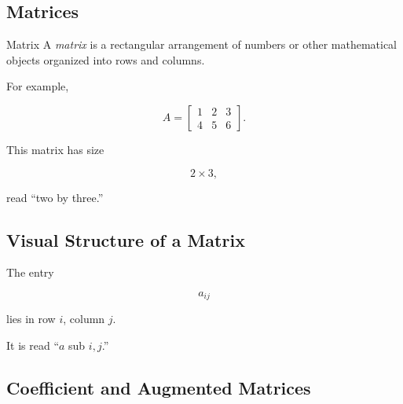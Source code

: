 \subsection{Matrices}
\label{subsec:matrices}

\begin{definitionbox}{Matrix}
A \emph{matrix} is a rectangular arrangement of numbers or other mathematical
objects organized into rows and columns.
\end{definitionbox}

For example,

\[ A=\begin{bmatrix}1&2&3\\4&5&6\end{bmatrix}. \]

This matrix has size

\[ 2\times3, \]

read ``two by three.''

\subsection{Visual Structure of a Matrix}
\label{subsec:visual-matrix-structure}

\begin{center}
\end{center}

The entry

\[ a_{ij} \]

lies in row \(i\), column \(j\).

It is read ``\(a\) sub \(i,j\).''

\subsection{Coefficient and Augmented Matrices}
\label{subsec:coefficient-augmented-matrices}

